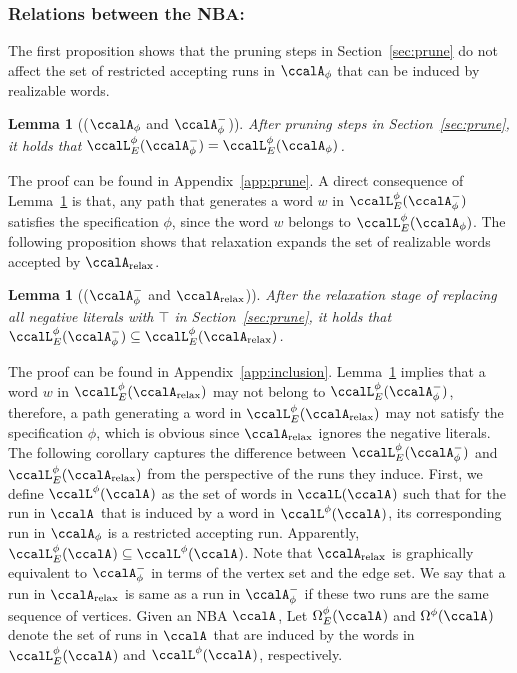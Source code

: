 \documentclass[Afour,sageh,times]{sagej}
\newtheorem{lem}[thm]{Lemma}
\newcommand{\auto}[1]{\ccalA_{\textup{#1}}}
\newcommand{\autop}{\ccalA_{\phi}}
\begin{document}
{\subsubsection{Relations between the NBA:}\label{app:relation}
  The first proposition shows that the pruning steps in Section~\ref{sec:prune} do not affect the set of restricted accepting runs  in $\autop$ that can be induced by realizable words.
 \begin{lem}[($\autop$ and $\autop^-$)]\label{prop:prune}
After pruning steps in Section~\ref{sec:prune}, it holds that  $\ccalL_E^\phi(\autop^-) = \ccalL^\phi_E(\autop)$.
  \end{lem}
    The proof can be found in Appendix~\ref{app:prune}. A direct consequence of Lemma~\ref{prop:prune} is that, any path that generates a word $w$ in  $\ccalL_E^\phi(\autop^-)$ satisfies the specification $\phi$, since the word $w$ belongs to $\ccalL^\phi_E(\autop)$. The following proposition shows that relaxation expands the set of realizable words accepted by $\auto{relax}$.
  \begin{lem}[($\autop^-$ and $\auto{relax}$)]\label{prop:inclusion}
 After the relaxation stage of replacing all negative literals with $\top$ in Section~\ref{sec:prune}, it holds that $\ccalL^\phi_E(\autop^-) \subseteq \ccalL^\phi_E(\auto{relax})$.
  \end{lem}
  The proof can be found in Appendix~\ref{app:inclusion}. Lemma~\ref{prop:inclusion} implies that a word $w$ in $\ccalL^\phi_E(\auto{relax})$ may not belong to $\ccalL^\phi_E(\autop^-)$, therefore, a path generating a word in $\ccalL^\phi_E(\auto{relax})$ may not satisfy the specification $\phi$, which is obvious since $\auto{relax}$ ignores the negative literals. The following corollary captures the difference between $\ccalL^\phi_E(\autop^-) $ and $\ccalL^\phi_E(\auto{relax})$ from the perspective of the runs they induce. First, we define $\ccalL^\phi(\auto{})$ as the set of  words in $\ccalL(\auto{})$ such that for the run in $\auto{}$ that is induced by a word in $\ccalL^\phi(\auto{})$, its corresponding run in $\autop$ is a restricted accepting run. Apparently, $\ccalL_E^\phi(\auto{})  \subseteq \ccalL^\phi(\auto{})$.  Note that   $\auto{relax}$ is graphically equivalent to $\autop^-$ in terms of the vertex set and the edge set. We say that a run in $\auto{relax}$ is same as a run in $\autop^-$ if these two runs are the same sequence of vertices. Given an NBA $\auto{}$, Let $\Omega_E^\phi(\auto{})$ and $\Omega^\phi(\auto{})$ denote the set of runs in $\auto{}$ that are induced by the words in $\ccalL_E^\phi(\auto{})$ and $\ccalL^\phi(\auto{})$, respectively.
}
\end{document}
